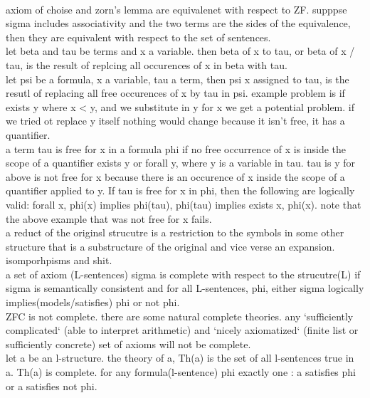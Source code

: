 \documentclass[11pt]{amsart}
\begin{document}
    \\ axiom of choise and zorn's lemma are equivalenet with respect to ZF.
    supppse sigma includes associativity and the two terms are the sides of the equivalence, then they are equivalent with respect to the set of sentences.
    \\
    let beta and tau be terms and x a variable.
    then beta of x to tau, or beta of x / tau, is the result of replcing all occurences of x in beta with tau.
    \\
    let psi be a formula, x a variable, tau a term, then psi x assigned to tau, is the resutl of replacing all free occurences of x by tau in psi.
    example problem is if exists y where x < y, and we substitute in y for x we get a potential problem.
    if we tried ot replace y itself nothing would change because it isn't free, it has a quantifier.
    \\
    a term tau is free for x in a formula phi if no free occurrence of x is inside the scope of a quantifier exists y or forall y, where y is a variable in tau.
    tau is y for above is not free for x because there is an occurence of x inside the scope of a quantifier applied to y.
    If tau is free for x in phi, then the following are logically valid: forall x, phi(x) implies phi(tau), phi(tau) implies exists x, phi(x).
    note that the above example that was not free for x fails.
    \\
    a reduct of the originsl strucutre is a restriction to the symbols in some other structure that is a substructure of the original and vice verse an expansion.
    \\
    isomporhpisms and shit.
    \\
    a set of axiom (L-sentences) sigma is complete with respect to the strucutre(L) if sigma is semantically consistent and for all L-sentences, phi, either sigma logically implies(models/satisfies) phi or not phi.
    \\
    ZFC is not complete.
    there are some natural complete theories.
    any `sufficiently complicated` (able to interpret arithmetic) and `nicely axiomatized` (finite list or sufficiently concrete) set of axioms will not be complete.
    \\
    let a be an l-structure.
    the theory of a, Th(a) is the set of all l-sentences true in a.
    Th(a) is complete.
    for any formula(l-sentence) phi exactly one : a satisfies phi or a satisfies not phi.
    \\
\end{document}
